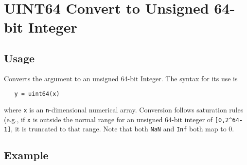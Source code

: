 \section{UINT64 Convert to Unsigned 64-bit Integer}

\subsection{Usage}

Converts the argument to an unsigned 64-bit Integer.  The syntax
for its use is
\begin{verbatim}
   y = uint64(x)
\end{verbatim}
where \verb|x| is an \verb|n|-dimensional numerical array.  Conversion
follows saturation rules (e.g., if \verb|x| is outside the normal
range for an unsigned 64-bit integer of \verb|[0,2^64-1]|, it is
truncated to that range.  Note that both \verb|NaN| and \verb|Inf| both map to 0.
\subsection{Example}

